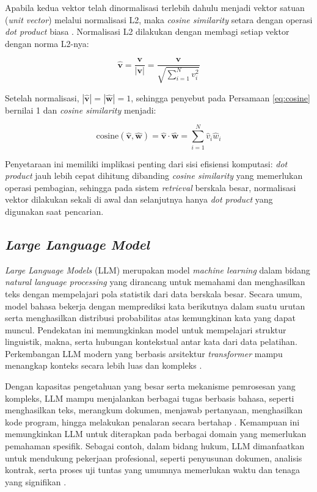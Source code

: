 Apabila kedua vektor telah dinormalisasi terlebih dahulu menjadi vektor satuan (\textit{unit vector}) melalui normalisasi L2, maka \textit{cosine similarity} setara dengan operasi \textit{dot product} biasa \cite{jurafsky2026slp}. Normalisasi L2 dilakukan dengan membagi setiap vektor dengan norma L2-nya:

\begin{equation}
	\hat{\mathbf{v}} = \frac{\mathbf{v}}{|\mathbf{v}|} = \frac{\mathbf{v}}{\sqrt{\displaystyle\sum_{i=1}^{N} v_i^2}}
	\label{eq:l2norm}
\end{equation}

Setelah normalisasi, $|\hat{\mathbf{v}}| = |\hat{\mathbf{w}}| = 1$, sehingga penyebut pada Persamaan \ref{eq:cosine} bernilai 1 dan \textit{cosine similarity} menjadi:

\begin{equation}
	\text{cosine}(\hat{\mathbf{v}}, \hat{\mathbf{w}}) = \hat{\mathbf{v}} \cdot \hat{\mathbf{w}} = \sum_{i=1}^{N} \hat{v}_i \hat{w}_i
	\label{eq:dot_normalized}
\end{equation}

Penyetaraan ini memiliki implikasi penting dari sisi efisiensi komputasi: \textit{dot product} jauh lebih cepat dihitung dibanding \textit{cosine similarity} yang memerlukan operasi pembagian, sehingga pada sistem \textit{retrieval} berskala besar, normalisasi vektor dilakukan sekali di awal dan selanjutnya hanya \textit{dot product} yang digunakan saat pencarian.


\subsection{\textit{Large Language Model}}

\textit{Large Language Models} (LLM) merupakan model \textit{machine learning} dalam bidang \textit{natural language processing} yang dirancang untuk memahami dan menghasilkan teks dengan mempelajari pola statistik dari data berskala besar. Secara umum, model bahasa bekerja dengan memprediksi kata berikutnya dalam suatu urutan serta menghasilkan distribusi probabilitas atas kemungkinan kata yang dapat muncul. Pendekatan ini memungkinkan model untuk mempelajari struktur linguistik, makna, serta hubungan kontekstual antar kata dari data pelatihan. Perkembangan LLM modern yang berbasis arsitektur \textit{transformer} mampu menangkap konteks secara lebih luas dan kompleks \cite{jurafsky2026slp}.

Dengan kapasitas pengetahuan yang besar serta mekanisme pemrosesan yang kompleks, LLM mampu menjalankan berbagai tugas berbasis bahasa, seperti menghasilkan teks, merangkum dokumen, menjawab pertanyaan, menghasilkan kode program, hingga melakukan penalaran secara bertahap \cite{mienye2025llm,shao2024llmsurvey}. Kemampuan ini memungkinkan LLM untuk diterapkan pada berbagai domain yang memerlukan pemahaman spesifik. Sebagai contoh, dalam bidang hukum, LLM dimanfaatkan untuk mendukung pekerjaan profesional, seperti penyusunan dokumen, analisis kontrak, serta proses uji tuntas yang umumnya memerlukan waktu dan tenaga yang signifikan \cite{katz2024gpt4bar}.


